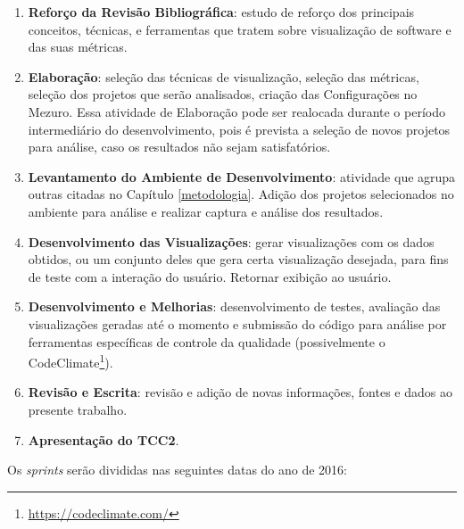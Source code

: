 \begin{enumerate}[label=(\alph*)]
\item \textbf{Reforço da Revisão Bibliográfica}: estudo de reforço dos
principais conceitos, técnicas, e ferramentas que tratem sobre visualização de
software e das suas métricas.
\item \textbf{Elaboração}: seleção das técnicas de visualização, seleção das
métricas, seleção dos projetos que serão analisados, criação das Configurações
no Mezuro. Essa atividade de Elaboração pode ser realocada durante o período
intermediário do desenvolvimento, pois é prevista a seleção de novos projetos
para análise, caso os resultados não sejam satisfatórios.
\item \textbf{Levantamento do Ambiente de Desenvolvimento}: atividade que
agrupa outras citadas no Capítulo \ref{metodologia}. Adição dos projetos
selecionados no ambiente para análise e realizar captura e análise dos
resultados.
\item \textbf{Desenvolvimento das Visualizações}: gerar visualizações com os
dados obtidos, ou um conjunto deles que gera certa visualização desejada, para
fins de teste com a interação do usuário. Retornar exibição ao usuário.
\item \textbf{Desenvolvimento e Melhorias}: desenvolvimento de testes, avaliação
das visualizações geradas até o momento e submissão do código para análise por
ferramentas específicas de controle da qualidade (possivelmente o
CodeClimate\footnote{\url{https://codeclimate.com/}}).
\item \textbf{Revisão e Escrita}: revisão e adição de novas informações, fontes
e dados ao presente trabalho.
\item \textbf{Apresentação do TCC2}.
\end{enumerate}

Os \textit{sprints} serão divididas nas seguintes datas do ano de 2016:

